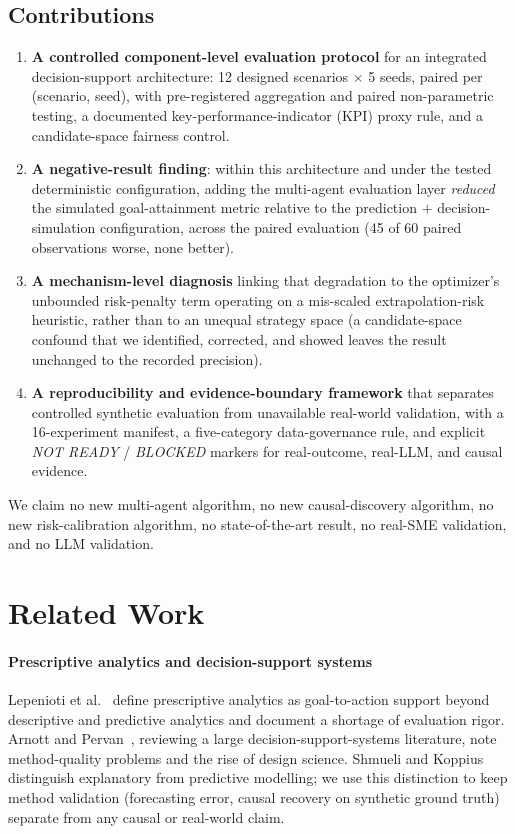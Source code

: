 \documentclass[conference]{IEEEtran}
\begin{document}
\subsection{Contributions}
\begin{enumerate}
\item \textbf{A controlled component-level evaluation protocol} for an
integrated decision-support architecture: 12 designed scenarios $\times$ 5
seeds, paired per (scenario, seed), with pre-registered aggregation and paired
non-parametric testing, a documented key-performance-indicator (KPI) proxy
rule, and a candidate-space fairness control.
\item \textbf{A negative-result finding}: within this architecture and under
the tested deterministic configuration, adding the multi-agent evaluation layer
\emph{reduced} the simulated goal-attainment metric relative to the
prediction $+$ decision-simulation configuration, across the paired evaluation
(45 of 60 paired observations worse, none better).
\item \textbf{A mechanism-level diagnosis} linking that degradation to the
optimizer's unbounded risk-penalty term operating on a mis-scaled
extrapolation-risk heuristic, rather than to an unequal strategy space (a
candidate-space confound that we identified, corrected, and showed leaves the
result unchanged to the recorded precision).
\item \textbf{A reproducibility and evidence-boundary framework} that separates
controlled synthetic evaluation from unavailable real-world validation, with a
16-experiment manifest, a five-category data-governance rule, and explicit
\emph{NOT READY} / \emph{BLOCKED} markers for real-outcome, real-LLM, and causal
evidence.
\end{enumerate}
We claim no new multi-agent algorithm, no new causal-discovery algorithm, no new
risk-calibration algorithm, no state-of-the-art result, no real-SME validation,
and no LLM validation.

\section{Related Work}
\label{sec:related}

\paragraph{Prescriptive analytics and decision-support systems}
Lepenioti et al.~\cite{Lepenioti2020} define prescriptive analytics as
goal-to-action support beyond descriptive and predictive analytics and document
a shortage of evaluation rigor. Arnott and Pervan~\cite{Arnott2014}, reviewing a
large decision-support-systems literature, note method-quality problems and the
rise of design science. Shmueli and Koppius~\cite{Shmueli2011} distinguish
explanatory from predictive modelling; we use this distinction to keep method
validation (forecasting error, causal recovery on synthetic ground truth)
separate from any causal or real-world claim.
\end{document}
